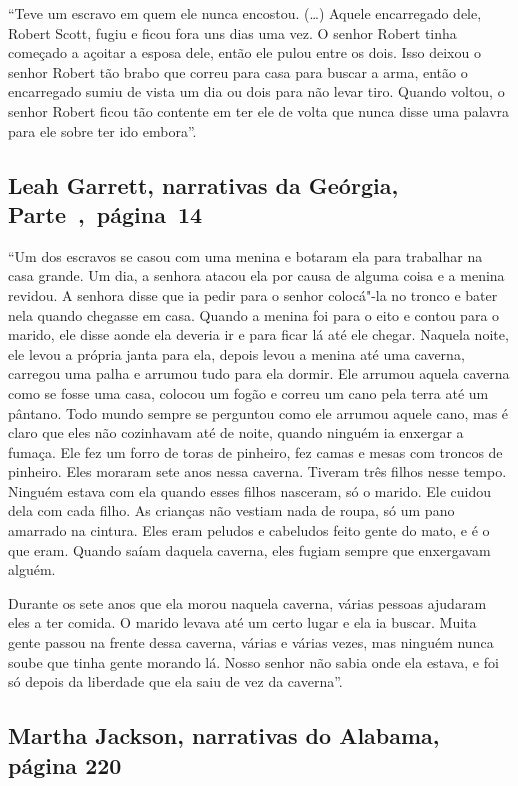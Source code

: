 ``Teve um escravo em quem ele nunca encostou. (\ldots{}) Aquele
encarregado dele, Robert Scott, fugiu e ficou fora uns dias uma vez. O
senhor Robert tinha começado a açoitar a esposa dele, então ele pulou
entre os dois. Isso deixou o senhor Robert tão brabo que correu para
casa para buscar a arma, então o encarregado sumiu de vista um dia ou
dois para não levar tiro. Quando voltou, o senhor Robert ficou tão
contente em ter ele de volta que nunca disse uma palavra para ele sobre
ter ido embora''.

\subsection{Leah Garrett, narrativas da Geórgia, Parte~,~página~14} \label{ref102}

``Um dos escravos se casou com uma menina e botaram ela para trabalhar
na casa grande. Um dia, a senhora atacou ela por causa de alguma coisa e
a menina revidou. A senhora disse que ia pedir para o senhor colocá"-la no
tronco e bater nela quando chegasse em casa. Quando a menina foi para o
eito e contou para o marido, ele disse aonde ela deveria ir e para ficar
lá até ele chegar. Naquela noite, ele levou a própria janta para ela,
depois levou a menina até uma caverna, carregou uma palha e arrumou tudo
para ela dormir. Ele arrumou aquela caverna como se fosse uma casa,
colocou um fogão e correu um cano pela terra até um pântano. Todo mundo
sempre se perguntou como ele arrumou aquele cano, mas é claro que eles
não cozinhavam até de noite, quando ninguém ia enxergar a fumaça. Ele
fez um forro de toras de pinheiro, fez camas e mesas com troncos de
pinheiro. Eles moraram sete anos nessa caverna. Tiveram três filhos
nesse tempo. Ninguém estava com ela quando esses filhos nasceram, só o
marido. Ele cuidou dela com cada filho. As crianças não vestiam nada de
roupa, só um pano amarrado na cintura. Eles eram peludos e cabeludos
feito gente do mato, e é o que eram. Quando saíam daquela caverna, eles
fugiam sempre que enxergavam alguém.

Durante os sete anos que ela morou naquela caverna, várias pessoas
ajudaram eles a ter comida. O marido levava até um certo lugar e ela ia
buscar. Muita gente passou na frente dessa caverna, várias e várias
vezes, mas ninguém nunca soube que tinha gente morando lá. Nosso senhor
não sabia onde ela estava, e foi só depois da liberdade que ela saiu de
vez da caverna''.

\subsection{Martha Jackson, narrativas do Alabama, página 220}
\label{ref160}

